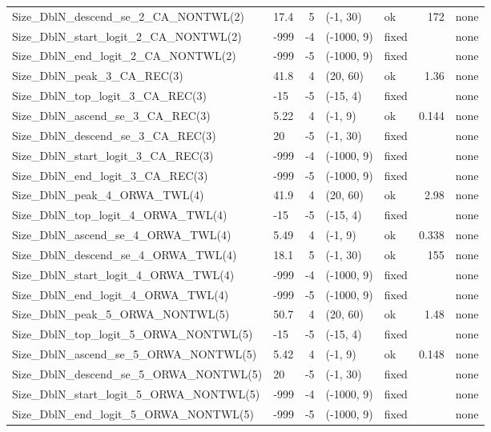 \documentclass[
]{scrartcl}
\begin{document}
\begin{landscape}
\begin{longtable}{llrllrl}
Size\_DblN\_descend\_se\_2\_CA\_NONTWL(2) & 17.4 & 5 & (-1, 30) & ok & 172 & none \\ 
Size\_DblN\_start\_logit\_2\_CA\_NONTWL(2) & -999 & -4 & (-1000, 9) & fixed &  & none \\ 
Size\_DblN\_end\_logit\_2\_CA\_NONTWL(2) & -999 & -5 & (-1000, 9) & fixed &  & none \\ 
Size\_DblN\_peak\_3\_CA\_REC(3) & 41.8 & 4 & (20, 60) & ok & 1.36 & none \\ 
Size\_DblN\_top\_logit\_3\_CA\_REC(3) & -15 & -5 & (-15, 4) & fixed &  & none \\ 
Size\_DblN\_ascend\_se\_3\_CA\_REC(3) & 5.22 & 4 & (-1, 9) & ok & 0.144 & none \\ 
Size\_DblN\_descend\_se\_3\_CA\_REC(3) & 20 & -5 & (-1, 30) & fixed &  & none \\ 
Size\_DblN\_start\_logit\_3\_CA\_REC(3) & -999 & -4 & (-1000, 9) & fixed &  & none \\ 
Size\_DblN\_end\_logit\_3\_CA\_REC(3) & -999 & -5 & (-1000, 9) & fixed &  & none \\ 
Size\_DblN\_peak\_4\_ORWA\_TWL(4) & 41.9 & 4 & (20, 60) & ok & 2.98 & none \\ 
Size\_DblN\_top\_logit\_4\_ORWA\_TWL(4) & -15 & -5 & (-15, 4) & fixed &  & none \\ 
Size\_DblN\_ascend\_se\_4\_ORWA\_TWL(4) & 5.49 & 4 & (-1, 9) & ok & 0.338 & none \\ 
Size\_DblN\_descend\_se\_4\_ORWA\_TWL(4) & 18.1 & 5 & (-1, 30) & ok & 155 & none \\ 
Size\_DblN\_start\_logit\_4\_ORWA\_TWL(4) & -999 & -4 & (-1000, 9) & fixed &  & none \\ 
Size\_DblN\_end\_logit\_4\_ORWA\_TWL(4) & -999 & -5 & (-1000, 9) & fixed &  & none \\ 
Size\_DblN\_peak\_5\_ORWA\_NONTWL(5) & 50.7 & 4 & (20, 60) & ok & 1.48 & none \\ 
Size\_DblN\_top\_logit\_5\_ORWA\_NONTWL(5) & -15 & -5 & (-15, 4) & fixed &  & none \\ 
Size\_DblN\_ascend\_se\_5\_ORWA\_NONTWL(5) & 5.42 & 4 & (-1, 9) & ok & 0.148 & none \\ 
Size\_DblN\_descend\_se\_5\_ORWA\_NONTWL(5) & 20 & -5 & (-1, 30) & fixed &  & none \\ 
Size\_DblN\_start\_logit\_5\_ORWA\_NONTWL(5) & -999 & -4 & (-1000, 9) & fixed &  & none \\ 
Size\_DblN\_end\_logit\_5\_ORWA\_NONTWL(5) & -999 & -5 & (-1000, 9) & fixed &  & none \\ 

\end{longtable}
\end{landscape}
\end{document}
